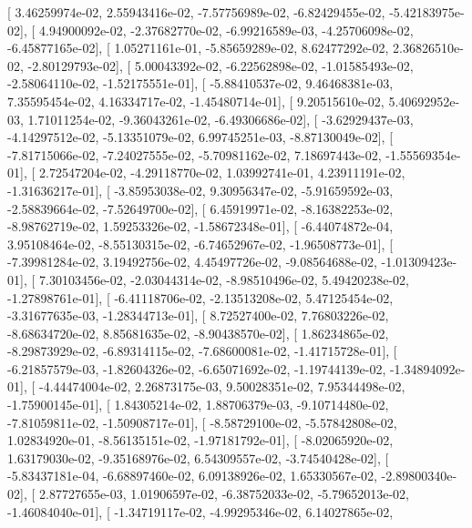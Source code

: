 \documentclass{article}
\begin{document}
       [  3.46259974e-02,   2.55943416e-02,  -7.57756989e-02,
         -6.82429455e-02,  -5.42183975e-02],
       [  4.94900092e-02,  -2.37682770e-02,  -6.99216589e-03,
         -4.25706098e-02,  -6.45877165e-02],
       [  1.05271161e-01,  -5.85659289e-02,   8.62477292e-02,
          2.36826510e-02,  -2.80129793e-02],
       [  5.00043392e-02,  -6.22562898e-02,  -1.01585493e-02,
         -2.58064110e-02,  -1.52175551e-01],
       [ -5.88410537e-02,   9.46468381e-03,   7.35595454e-02,
          4.16334717e-02,  -1.45480714e-01],
       [  9.20515610e-02,   5.40692952e-03,   1.71011254e-02,
         -9.36043261e-02,  -6.49306686e-02],
       [ -3.62929437e-03,  -4.14297512e-02,  -5.13351079e-02,
          6.99745251e-03,  -8.87130049e-02],
       [ -7.81715066e-02,  -7.24027555e-02,  -5.70981162e-02,
          7.18697443e-02,  -1.55569354e-01],
       [  2.72547204e-02,  -4.29118770e-02,   1.03992741e-01,
          4.23911191e-02,  -1.31636217e-01],
       [ -3.85953038e-02,   9.30956347e-02,  -5.91659592e-03,
         -2.58839664e-02,  -7.52649700e-02],
       [  6.45919971e-02,  -8.16382253e-02,  -8.98762719e-02,
          1.59253326e-02,  -1.58672348e-01],
       [ -6.44074872e-04,   3.95108464e-02,  -8.55130315e-02,
         -6.74652967e-02,  -1.96508773e-01],
       [ -7.39981284e-02,   3.19492756e-02,   4.45497726e-02,
         -9.08564688e-02,  -1.01309423e-01],
       [  7.30103456e-02,  -2.03044314e-02,  -8.98510496e-02,
          5.49420238e-02,  -1.27898761e-01],
       [ -6.41118706e-02,  -2.13513208e-02,   5.47125454e-02,
         -3.31677635e-03,  -1.28344713e-01],
       [  8.72527400e-02,   7.76803226e-02,  -8.68634720e-02,
          8.85681635e-02,  -8.90438570e-02],
       [  1.86234865e-02,  -8.29873929e-02,  -6.89314115e-02,
         -7.68600081e-02,  -1.41715728e-01],
       [ -6.21857579e-03,  -1.82604326e-02,  -6.65071692e-02,
         -1.19744139e-02,  -1.34894092e-01],
       [ -4.44474004e-02,   2.26873175e-03,   9.50028351e-02,
          7.95344498e-02,  -1.75900145e-01],
       [  1.84305214e-02,   1.88706379e-03,  -9.10714480e-02,
         -7.81059811e-02,  -1.50908717e-01],
       [ -8.58729100e-02,  -5.57842808e-02,   1.02834920e-01,
         -8.56135151e-02,  -1.97181792e-01],
       [ -8.02065920e-02,   1.63179030e-02,  -9.35168976e-02,
          6.54309557e-02,  -3.74540428e-02],
       [ -5.83437181e-04,  -6.68897460e-02,   6.09138926e-02,
          1.65330567e-02,  -2.89800340e-02],
       [  2.87727655e-03,   1.01906597e-02,  -6.38752033e-02,
         -5.79652013e-02,  -1.46084040e-01],
       [ -1.34719117e-02,  -4.99295346e-02,   6.14027865e-02,
\end{document}
